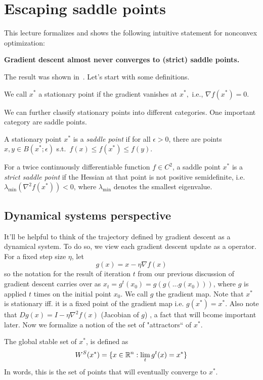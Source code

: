 \section{Escaping saddle points} 

This lecture formalizes and shows the following intuitive statement for
nonconvex optimization:
\begin{center}
	\textbf{Gradient descent almost never converges to (strict) saddle points.}
\end{center}
The result was shown in~\cite{lee2016gradient}. Let's start with some definitions.

\begin{definition}
We call $x^*$ a stationary point if the gradient vanishes at $x^*,$ i.e., 
$\nabla f(x^*) = 0$. 
\end{definition}

We can further classify stationary points into different categories. One
important category are saddle points.

\begin{definition}
A stationary point $x^*$ is a \emph{saddle point} 
if for all $\epsilon>0$,  there are points $x,y \in B(x^*;\epsilon)$ 
s.t.~$f(x)\leq f(x^*)\leq f(y)$.
\end{definition}

\begin{definition}
For a twice continuously differentiable function $f\in C^2$, a saddle point
$x^*$ is a \emph{strict saddle point} if the Hessian at that point is not
positive semidefinite, i.e.  $\lambda_{\text{min}}(\nabla^2 f(x^*)) < 0$, where
$\lambda_{\text{min}}$ denotes the smallest eigenvalue.
\end{definition}

\subsection{Dynamical systems perspective}

It'll be helpful to think of the trajectory defined by gradient descent as a
dynamical system.
To do so, we view each gradient descent update as a operator.  
For a fixed step size $\eta$, let
$$
g(x) = x-\eta\nabla f(x)
$$ 
so the notation for the result of iteration $t$ from our previous discussion of gradient descent carries over as $x_t = g^t(x_0) = g(g(...g(x_0)))$, where $g$ is applied $t$ times on the initial point $x_0$. We call $g$ the gradient map. Note that $x^*$ is stationary iff. it is a fixed point of the gradient map i.e. $g(x^*) = x^*$. Also note that
$D g(x) = I - \eta\nabla^2 f(x)$ (Jacobian of $g$) , a fact that will bcome important later. Now we formalize a notion of the set of "attractors`` of $x^*$.
\begin{definition}
The global stable set of $x^*$, is defined as
$$
W^S(x^*) = \{ x\in\mathbb{R}^n: \lim_{t} g^t(x) = x^* \}
$$
In words, this is the set of points that will eventually converge to $x^*$.
\end{definition}

